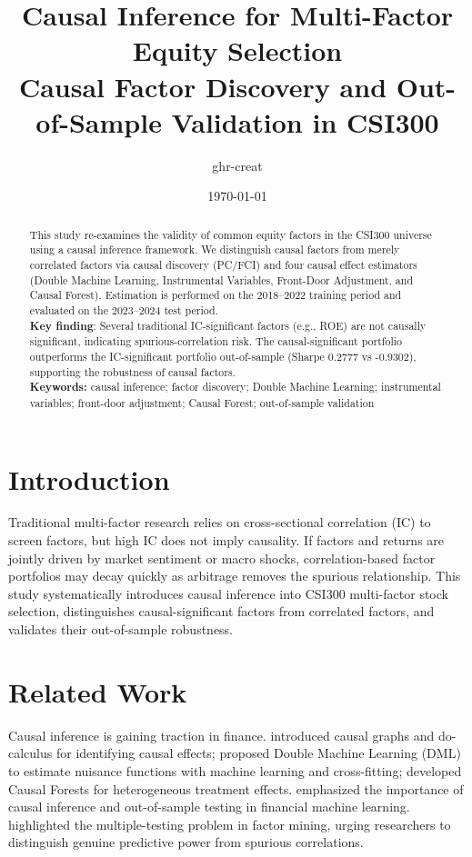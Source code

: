 \documentclass[12pt,a4paper]{article}
\title{\textbf{Causal Inference for Multi-Factor Equity Selection}\\\large Causal Factor Discovery and Out-of-Sample Validation in CSI300}
\author{ghr-creat}
\date{\today}
\begin{document}
\maketitle

\begin{abstract}
\noindent This study re-examines the validity of common equity factors in the CSI300 universe using a causal inference framework. We distinguish causal factors from merely correlated factors via causal discovery (PC/FCI) and four causal effect estimators (Double Machine Learning, Instrumental Variables, Front-Door Adjustment, and Causal Forest). Estimation is performed on the 2018--2022 training period and evaluated on the 2023--2024 test period.\\[6pt]
\textbf{Key finding}: Several traditional IC-significant factors (e.g., ROE) are not causally significant, indicating spurious-correlation risk. The causal-significant portfolio outperforms the IC-significant portfolio out-of-sample (Sharpe 0.2777 vs -0.9302), supporting the robustness of causal factors.\\[6pt]
\noindent\textbf{Keywords:} causal inference; factor discovery; Double Machine Learning; instrumental variables; front-door adjustment; Causal Forest; out-of-sample validation
\end{abstract}

\tableofcontents
\newpage

\section{Introduction}
Traditional multi-factor research relies on cross-sectional correlation (IC) to screen factors, but high IC does not imply causality. If factors and returns are jointly driven by market sentiment or macro shocks, correlation-based factor portfolios may decay quickly as arbitrage removes the spurious relationship. This study systematically introduces causal inference into CSI300 multi-factor stock selection, distinguishes causal-significant factors from correlated factors, and validates their out-of-sample robustness.

\section{Related Work}
Causal inference is gaining traction in finance. \cite{pearl2009causality} introduced causal graphs and do-calculus for identifying causal effects; \cite{chernozhukov2018double} proposed Double Machine Learning (DML) to estimate nuisance functions with machine learning and cross-fitting; \cite{wager2018estimation} developed Causal Forests for heterogeneous treatment effects. \cite{lopezdeprado2018advances} emphasized the importance of causal inference and out-of-sample testing in financial machine learning. \cite{harvey2016and} highlighted the multiple-testing problem in factor mining, urging researchers to distinguish genuine predictive power from spurious correlations.
\end{document}
